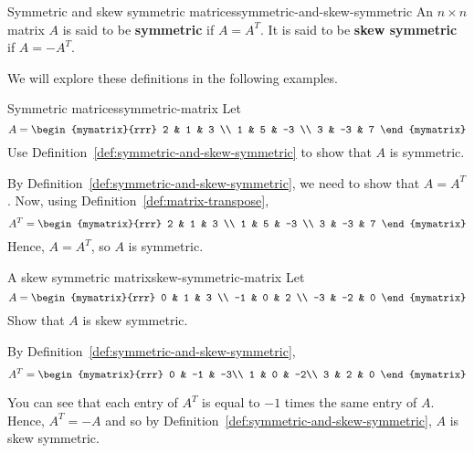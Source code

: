 \begin{definition}{Symmetric and skew symmetric
    matrices}{symmetric-and-skew-symmetric}
  An $n\times n$ matrix $A$ is said to be
  \textbf{symmetric} if $A=A^{T}$. It is said
  to be \textbf{skew symmetric} if
  $A=-A^{T}$.
\end{definition}

We will explore these definitions in the following examples.

\begin{example}{Symmetric matrices}{symmetric-matrix}
  Let
  \begin{equation*}
    A=\begin{mymatrix}{rrr}
      2 & 1 & 3 \\
      1 & 5 & -3 \\
      3 & -3 & 7
    \end{mymatrix} 
  \end{equation*}
  Use Definition~\ref{def:symmetric-and-skew-symmetric} to show that
  $A$ is symmetric.
\end{example}

\begin{solution}
  By Definition~\ref{def:symmetric-and-skew-symmetric}, we need to
  show that $A = A^T$.  Now, using Definition~\ref{def:matrix-transpose},
  \begin{equation*}
    A^{T} = \begin{mymatrix}{rrr}
      2 & 1 & 3 \\
      1 & 5 & -3 \\
      3 & -3 & 7
    \end{mymatrix}
  \end{equation*}
  Hence, $A = A^{T}$, so $A$ is symmetric.
\end{solution}

\begin{example}{A skew symmetric matrix}{skew-symmetric-matrix}
  Let
  \begin{equation*}
    A=\begin{mymatrix}{rrr}
      0 & 1 & 3 \\
      -1 & 0 & 2 \\
      -3 & -2 & 0
    \end{mymatrix} 
  \end{equation*}
  Show that $A$ is skew symmetric.
\end{example}

\begin{solution} By Definition~\ref{def:symmetric-and-skew-symmetric}, 
  \begin{equation*}
    A^{T} = \begin{mymatrix}{rrr}
      0 & -1 & -3\\
      1 &  0 & -2\\
      3 &  2 &  0
    \end{mymatrix} 
  \end{equation*}

  You can see that each entry of $A^T$ is equal to $-1$ times the same
  entry of $A$.  Hence, $A^{T} = - A$ and so by
  Definition~\ref{def:symmetric-and-skew-symmetric}, $A$ is skew
  symmetric.
\end{solution}
